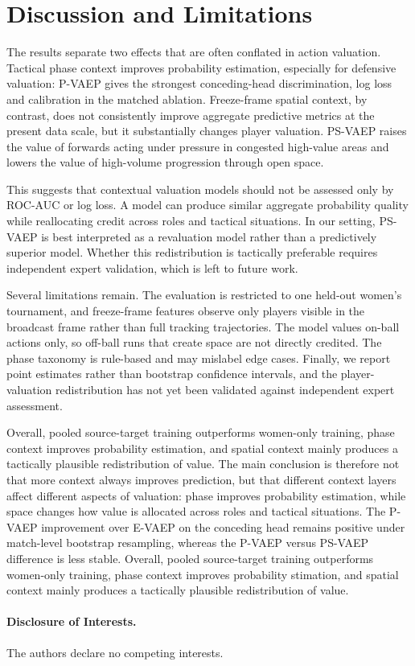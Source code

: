\documentclass[runningheads]{llncs}
\begin{document}
\section{Discussion and Limitations}

The results separate two effects that are often conflated in action valuation. Tactical phase context improves probability estimation, especially for defensive valuation: P-VAEP gives the strongest conceding-head discrimination, log loss and calibration in the matched ablation. Freeze-frame spatial context, by contrast, does not consistently improve aggregate predictive metrics at the present data scale, but it substantially changes player valuation. PS-VAEP raises the value of forwards acting under pressure in congested high-value areas and lowers the value of high-volume progression through open space.

This suggests that contextual valuation models should not be assessed only by ROC-AUC or log loss. A model can produce similar aggregate probability quality while reallocating credit across roles and tactical situations. In our setting, PS-VAEP is best interpreted as a revaluation model rather than a predictively superior model. Whether this redistribution is tactically preferable requires independent expert validation, which is left to future work.

Several limitations remain. The evaluation is restricted to one held-out women's tournament, and freeze-frame features observe only players visible in the broadcast frame rather than full tracking trajectories. The model values on-ball actions only, so off-ball runs that create space are not directly credited. The phase taxonomy is rule-based and may mislabel edge cases. Finally, we report point estimates rather than bootstrap confidence intervals, and the player-valuation redistribution has not yet been validated against independent expert assessment.

Overall, pooled source-target training outperforms women-only training, phase context improves probability estimation, and spatial context mainly produces a tactically plausible redistribution of value. The main conclusion is therefore not that more context always improves prediction, but that different context layers affect different aspects of valuation: phase improves probability estimation, while space changes how value is allocated across roles and tactical situations. The P-VAEP improvement over E-VAEP on the conceding head remains positive under match-level bootstrap resampling, whereas the P-VAEP versus PS-VAEP difference is less stable. Overall, pooled source-target training outperforms
women-only training, phase context improves probability  stimation, and spatial context mainly produces a tactically plausible redistribution of value.

\paragraph{Disclosure of Interests.}
The authors declare no competing interests.



\end{document}
